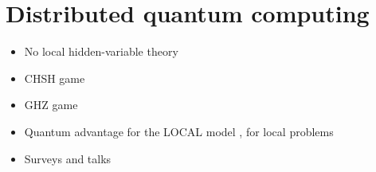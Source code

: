 \documentclass[a4paper,11pt]{article}
\begin{document}
\section{Distributed quantum computing}
\begin{itemize}
    \item No local hidden-variable theory \cite{bell-1964-on-the-einstein-podolsky-rosen-paradox}
    \item CHSH game \cite{clauser-horne-etal-1969-proposed-experiment-to-test}
    \item GHZ game \cite{greenberger-horne-zeilinger-1989-going-beyond-bell-s}
    \item Quantum advantage for the LOCAL model \cite{le-gall-nishimura-rosmanis-2019-quantum-advantage-for}, for local problems \cite{balliu-brandt-etal-2025-distributed-quantum-advantage,balliu-casagrande-etal-2025-distributed-quantum}
    \item Surveys and talks \cite{le-gall-2022-quantum-distributed-computing,d-amore-2025-on-the-limits-of-distributed-quantum}
\end{itemize}


\end{document}
